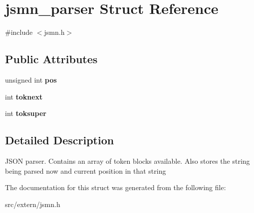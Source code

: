 \hypertarget{structjsmn__parser}{\section{jsmn\-\_\-parser Struct Reference}
\label{structjsmn__parser}
}


{\ttfamily \#include $<$jsmn.\-h$>$}

\subsection*{Public Attributes}
\begin{DoxyCompactItemize}
\item 
\hypertarget{structjsmn__parser_a3d0d6e48d3d5b24262f9e0c2241dc456}{unsigned int {\bfseries pos}}\label{structjsmn__parser_a3d0d6e48d3d5b24262f9e0c2241dc456}

\item 
\hypertarget{structjsmn__parser_a08fc7969f7f21b969e21e2aa8449eb67}{int {\bfseries toknext}}\label{structjsmn__parser_a08fc7969f7f21b969e21e2aa8449eb67}

\item 
\hypertarget{structjsmn__parser_af11fcec48d9f1298909777a12f1d1e39}{int {\bfseries toksuper}}\label{structjsmn__parser_af11fcec48d9f1298909777a12f1d1e39}

\end{DoxyCompactItemize}


\subsection{Detailed Description}
J\-S\-O\-N parser. Contains an array of token blocks available. Also stores the string being parsed now and current position in that string 

The documentation for this struct was generated from the following file\-:\begin{DoxyCompactItemize}
\item 
src/extern/jsmn.\-h\end{DoxyCompactItemize}
